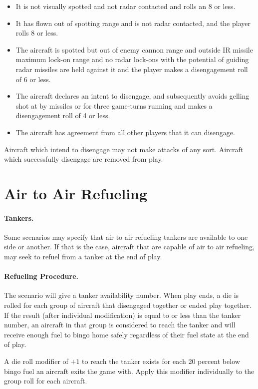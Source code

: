 \begin{itemize}

    \item It is not visually spotted and not radar contacted and rolls an 8 or less.

    \item It has flown out of spotting range and is not radar contacted, and the player rolls 8 or less.

    \item The aircraft is spotted but out of enemy cannon range and outside IR missile maximum lock-on range and no radar lock-ons with the potential of guiding radar missiles are held against it and the player makes a disengagement roll of 6 or less.

    \item The aircraft declares an intent to disengage, and subsequently avoids gelling shot at by missiles or for three game-turns running and makes a disengagement roll of 4 or less.

    \item The aircraft has agreement from all other players that it can disengage.

\end{itemize}

Aircraft which intend to disengage may not make attacks of any sort. Aircraft which successfully disengage are removed from play.

\section{Air to Air Refueling}
\label{rule:air-to-air-refueling}

\paragraph{Tankers.} Some scenarios may specify that air to air refueling tankers are available to one side or another. If that is the case, aircraft that are capable of air to air refueling, may seek to refuel from a tanker at the end of play.

\paragraph{Refueling Procedure.} The scenario will give a tanker availability number. When play ends, a die is rolled for each group of aircraft that disengaged together or ended play together. If the result (after individual modification) is equal to or less than the tanker number, an aircraft in that group is considered to reach the tanker and will receive enough fuel to bingo home safely regardless of their fuel state at the end of play.

A die roll modifier of $+1$ to reach the tanker exists for each 20 percent below bingo fuel an aircraft exits the game with. Apply this modifier individually to the group roll for each aircraft.
